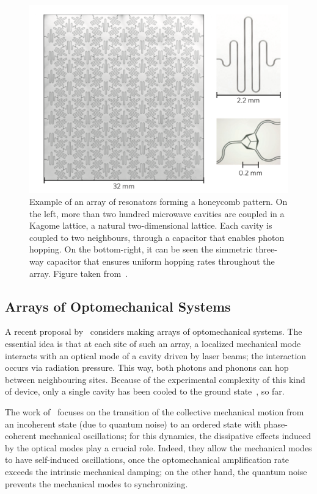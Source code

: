 \begin{figure}
    \centering
    \includegraphics[scale=0.6]{Figures/superconducting_circuits.png}
    \captionsetup{width=1.\linewidth}
    \caption{Example of an array of resonators forming a honeycomb pattern. On the left, more than two hundred microwave cavities are coupled in a Kagome lattice, a natural two-dimensional lattice. Each cavity is coupled to two neighbours, through a capacitor that enables photon hopping. On the bottom-right, it can be seen the simmetric three-way capacitor that ensures uniform hopping rates throughout the array. Figure taken from~\cite{supercircuitsQED}.}
    \label{fig:superconducting_circuits}
\end{figure}

\subsection{Arrays of Optomechanical Systems}
A recent proposal by~\cite{optomechanical_arrays} considers making arrays of optomechanical systems. The essential idea is that at each site of such an array, a localized mechanical mode interacts with an optical mode of a cavity driven by laser beams; the interaction occurs via radiation pressure. This way, both photons and phonons can hop between neighbouring sites. Because of the experimental complexity of this kind of device, only a single cavity has been cooled to the ground state~\cite{Lee_Haffner_Cross}, so far. 

The work of~\cite{optomechanical_arrays} focuses on the transition of the collective mechanical motion from an incoherent state (due to quantum noise) to an ordered state with phase-coherent mechanical oscillations; for this dynamics, the dissipative effects induced by the optical modes play a crucial role. Indeed, they allow the mechanical modes to have self-induced oscillations, once the optomechanical amplification rate exceeds the intrinsic mechanical damping; on the other hand, the quantum noise prevents the mechanical modes to synchronizing.


